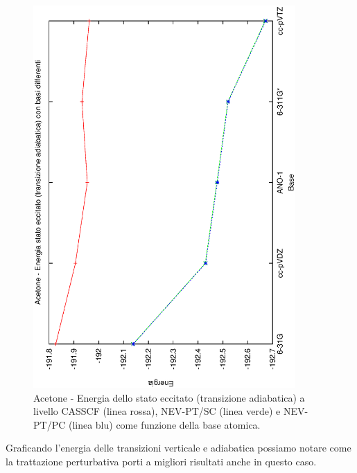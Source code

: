 \begin{figure}[ht]
\begin{center}
\includegraphics[angle=270,width=10cm,keepaspectratio]{immagini/acetone/adiab.eps}
\parbox[h]{12cm}{
\caption{\small Acetone - Energia dello stato eccitato (transizione adiabatica)
a livello CASSCF (linea rossa), NEV-PT/SC (linea verde) e NEV-PT/PC (linea blu)
come funzione della base atomica. }
\label{fig:acetone_adiab}
}
\end{center}
\end{figure}
\pagebreak
\clearpage
Graficando l'energia delle transizioni verticale e adiabatica possiamo notare come
la trattazione perturbativa porti a migliori risultati anche in questo caso.
